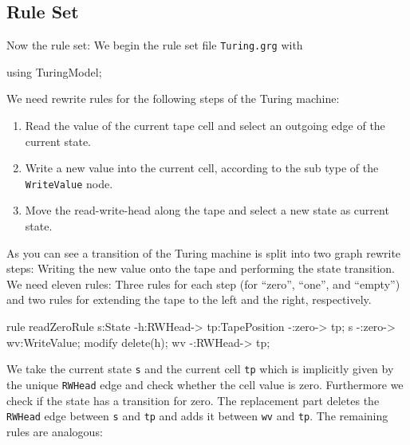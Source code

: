 \subsection{Rule Set}
Now the rule set: We begin the rule set file \texttt{Turing.grg} with
\begin{grgen}[firstnumber=1] 
using TuringModel;

\end{grgen}
We need rewrite rules for the following steps of the Turing machine:
\begin{enumerate}
  \item Read the value of the current tape cell and select an outgoing edge of the current state.
  \item Write a new value into the current cell, according to the sub type of the \texttt{WriteValue} node.
  \item Move the read-write-head along the tape and select a new state as current state. 
\end{enumerate}
As you can see a transition of the Turing machine is split into two graph rewrite steps: Writing the new value onto the tape and performing the state transition. We need eleven rules: Three rules for each step (for ``zero'', ``one'', and ``empty'') and two rules for extending the tape to the left and the right, respectively.
\begin{grgen}[firstnumber=last] 
rule readZeroRule {
	s:State -h:RWHead-> tp:TapePosition -:zero-> tp;
	s -:zero-> wv:WriteValue;
	modify {
		delete(h);
		wv -:RWHead-> tp;
	}
}      

\end{grgen}
We take the current state \texttt{s} and the current cell \texttt{tp} which is implicitly given by the unique \texttt{RWHead} edge and check whether the cell value is zero. Furthermore we check if the state has a transition for zero. The replacement part deletes the \texttt{RWHead} edge between \texttt{s} and \texttt{tp} and adds it between \texttt{wv} and \texttt{tp}. The remaining rules are analogous:
